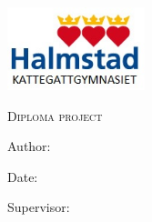 \documentclass[../main.tex]{subfiles}
\begin{document}
\begin{titlepage}
    \includegraphics[width=0.3\textwidth]{logo.png}\par
    \vspace{0.5cm}
	{\scshape\LARGE Diploma project\par}
	\vspace{0.2cm}
    {\Large Author: \@author\par}
    {\Large Date: \@date\par}
    {\Large Supervisor: \@supervisor\par}

	\centering
    \vspace{\fill}

    {\huge\itshape\@title\par}
    \vspace{0.2cm}
    {\Large\bfseries\@subtitle\par}

    \vspace{\fill}
    \vspace{\fill}
\end{titlepage}
\end{document}
